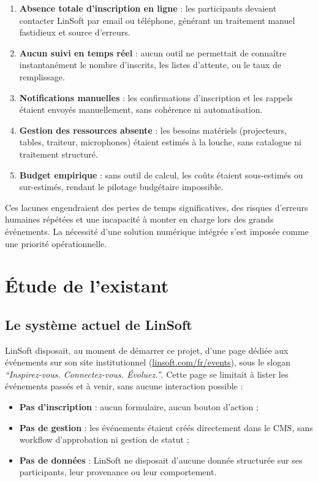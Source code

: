 \documentclass[12pt,a4paper]{report}
\begin{document}
\begin{enumerate}[leftmargin=1.5cm]
  \item \textbf{Absence totale d'inscription en ligne} : les participants devaient contacter
  LinSoft par email ou t\'el\'ephone, g\'en\'erant un traitement manuel fastidieux et source d'erreurs.
  \item \textbf{Aucun suivi en temps r\'eel} : aucun outil ne permettait de conna\^itre
  instantan\'ement le nombre d'inscrits, les listes d'attente, ou le taux de remplissage.
  \item \textbf{Notifications manuelles} : les confirmations d'inscription et les rappels
  \'etaient envoy\'es manuellement, sans coh\'erence ni automatisation.
  \item \textbf{Gestion des ressources absente} : les besoins mat\'eriels (projecteurs, tables,
  traiteur, microphones) \'etaient estim\'es \`a la louche, sans catalogue ni traitement structur\'e.
  \item \textbf{Budget empirique} : sans outil de calcul, les co\^uts \'etaient sous-estim\'es ou
  sur-estim\'es, rendant le pilotage budg\'etaire impossible.
\end{enumerate}

Ces lacunes engendraient des pertes de temps significatives, des risques d'erreurs humaines
r\'ep\'et\'ees et une incapacit\'e \`a monter en charge lors des grands \'ev\'enements. La
n\'ecessit\'e d'une solution num\'erique int\'egr\'ee s'est impos\'ee comme une priorit\'e
op\'erationnelle.

\section{\'Etude de l'existant}

\subsection{Le syst\`eme actuel de LinSoft}

LinSoft disposait, au moment de d\'emarrer ce projet, d'une page d\'edi\'ee aux \'ev\'enements
sur son site institutionnel (\url{linsoft.com/fr/events}), sous le slogan
\textit{``Inspirez-vous. Connectez-vous. \'Evoluez.''}. Cette page se limitait \`a lister
les \'ev\'enements pass\'es et \`a venir, sans aucune interaction possible :

\begin{itemize}[noitemsep]
  \item \textbf{Pas d'inscription} : aucun formulaire, aucun bouton d'action ;
  \item \textbf{Pas de gestion} : les \'ev\'enements \'etaient cr\'e\'es directement dans le CMS,
  sans workflow d'approbation ni gestion de statut ;
  \item \textbf{Pas de donn\'ees} : LinSoft ne disposait d'aucune donn\'ee structur\'ee sur ses
  participants, leur provenance ou leur comportement.
\end{itemize}
\end{document}
